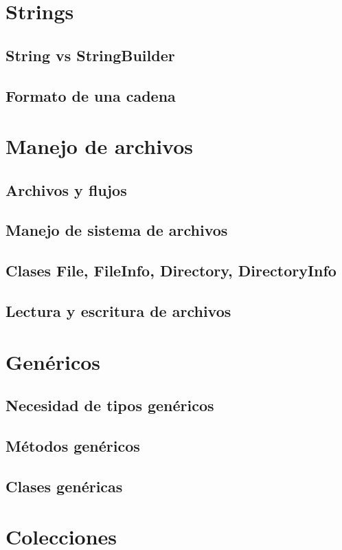 \documentclass[12pt,a4paper]{report}
\begin{document}
\chapter{Strings}
\section{String vs StringBuilder}
\section{Formato de una cadena}
	
\chapter{Manejo de archivos}
\section{Archivos y flujos}
\section{Manejo de sistema de archivos}
\section{Clases File, FileInfo, Directory, DirectoryInfo}
\section{Lectura y escritura de archivos}

\chapter{Genéricos}
\section{Necesidad de tipos genéricos}
\section{Métodos genéricos}
\section{Clases genéricas}

\chapter{Colecciones}
\end{document}

